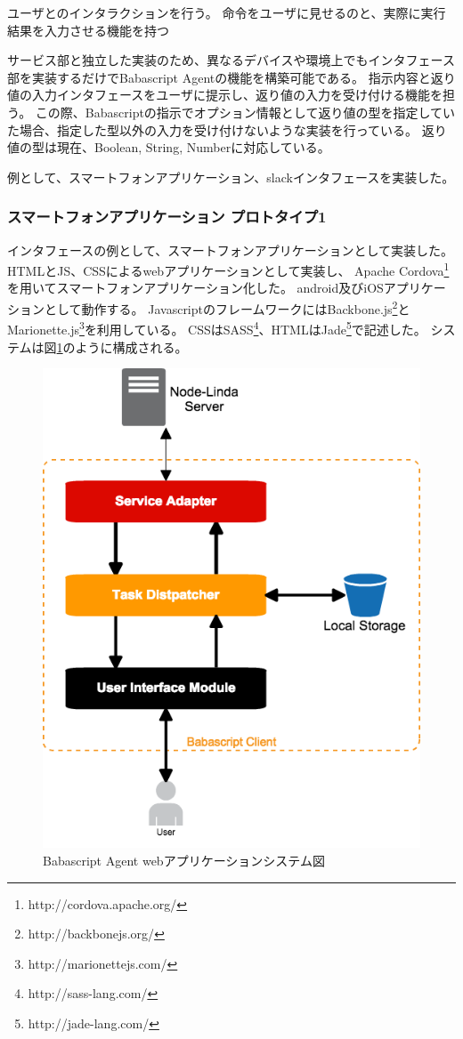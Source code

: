 ユーザとのインタラクションを行う。
命令をユーザに見せるのと、実際に実行結果を入力させる機能を持つ

サービス部と独立した実装のため、異なるデバイスや環境上でもインタフェース部を実装するだけでBabascript
Agentの機能を構築可能である。
指示内容と返り値の入力インタフェースをユーザに提示し、返り値の入力を受け付ける機能を担う。
この際、Babascriptの指示でオプション情報として返り値の型を指定していた場合、指定した型以外の入力を受け付けないような実装を行っている。
返り値の型は現在、Boolean, String, Numberに対応している。

例として、スマートフォンアプリケーション、slackインタフェースを実装した。

\subsubsection{スマートフォンアプリケーション
プロトタイプ1}\label{ux30b9ux30deux30fcux30c8ux30d5ux30a9ux30f3ux30a2ux30d7ux30eaux30b1ux30fcux30b7ux30e7ux30f3-ux30d7ux30edux30c8ux30bfux30a4ux30d71}

インタフェースの例として、スマートフォンアプリケーションとして実装した。
HTMLとJS、CSSによるwebアプリケーションとして実装し、 Apache
Cordova\footnote{http://cordova.apache.org/}を用いてスマートフォンアプリケーション化した。
android及びiOSアプリケーションとして動作する。
JavascriptのフレームワークにはBackbone.js\footnote{http://backbonejs.org/}とMarionette.js\footnote{http://marionettejs.com/}を利用している。
CSSはSASS\footnote{http://sass-lang.com/}、HTMLはJade\footnote{http://jade-lang.com/}で記述した。
システムは図\ref{fig:client-overview}のように構成される。

\begin{figure}[htbp]
  \begin{center}
  \includegraphics[width=.5\linewidth,bb=0 0 511 650]{images/client-overview.png}
  \end{center}
  \caption{Babascript Agent webアプリケーションシステム図}
  \label{fig:client-overview}
\end{figure}

